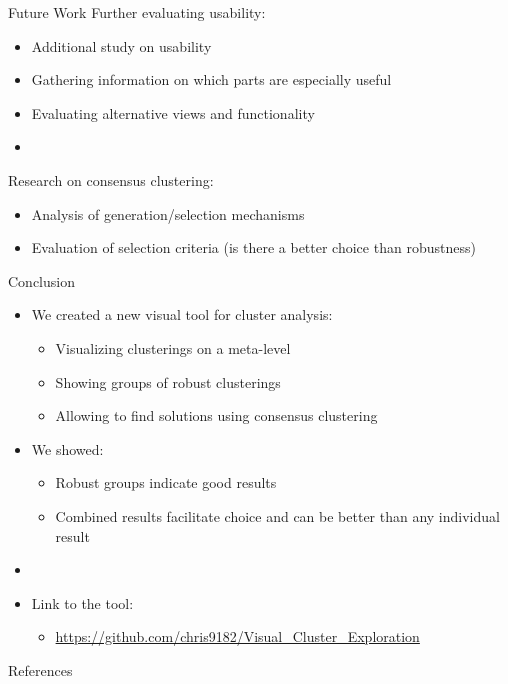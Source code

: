 \documentclass[aspectratio=169]{beamer}
\begin{document}
\begin{frame}{Future Work}
Further evaluating usability:
	\begin{itemize}
	 	\item Additional study on usability
		\item Gathering information on which parts are especially useful
		\item Evaluating alternative views and functionality
		\item[]
	\end{itemize}

Research on consensus clustering:
	\begin{itemize}
	 	\item Analysis of generation/selection mechanisms
		\item Evaluation of selection criteria (is there a better choice than robustness)
	\end{itemize}

\end{frame}


\begin{frame}{Conclusion}

	\begin{itemize}
		\item We created a new visual tool for cluster analysis:
		\begin{itemize}
		 	\item Visualizing clusterings on a meta-level
			\item Showing groups of robust clusterings
			\item Allowing to find solutions using consensus clustering
		\end{itemize}
		\item We showed:
		\begin{itemize}
		 	\item Robust groups indicate good results
		 	\item Combined results facilitate choice and can be better than any individual result
		\end{itemize}
		\item[]
		\item Link to the tool:
		\begin{itemize}
			\item \url{https://github.com/chris9182/Visual_Cluster_Exploration}
		\end{itemize}
	\end{itemize}

\end{frame}

\begin{frame}[allowframebreaks]{References}
\printbibliography
\end{frame}
\end{document}

